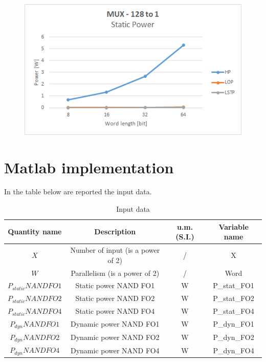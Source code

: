 \begin{figure}[!h]
	\centering
	\includegraphics[scale=0.8]{immagini/128to1S}
	\caption{\textit{}} 
	\label{10}
\end{figure}
\newpage
\section{Matlab implementation}
In the table below are reported the input data.

\begin{table}[h]
	\begin{center}
		\begin{tabular}{|c|c|c|c|} \hline
			\textbf{Quantity name} & \textbf{Description} & \textbf{u.m. (S.I.)} & \textbf{Variable name} \\ \hline
			$X$ &Number of input (is a power of 2) & / & X \\ 
			$W$ &Parallelism (is a power of 2) & / & Word \\
			$P_{static} NAND FO1$ &Static power NAND FO1 & W & P\_stat\_FO1 \\ 
			$P_{static} NAND FO2$ &Static power NAND FO2 & W & P\_stat\_FO2 \\ 
			$P_{static} NAND FO4$ &Static power NAND FO4 & W & P\_stat\_FO4 \\ 
			$P_{dyn} NAND FO1$ &Dynamic power NAND FO1 & W & P\_dyn\_FO1 \\ 
			$P_{dyn} NAND FO2$ &Dynamic power NAND FO2 & W & P\_dyn\_FO2 \\ 
			$P_{dyn} NAND FO4$ &Dynamic power NAND FO4 & W & P\_dyn\_FO4 \\  \hline 
		\end{tabular}
	\end{center}
	\caption{Input data}
	\label{tab1}
\end{table}

